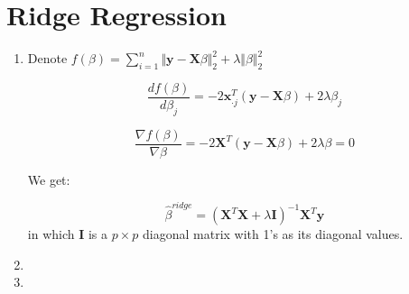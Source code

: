 \documentclass[paper=letter, fontsize=12pt]{article}
\begin{document}
\section{Ridge Regression}

\begin{enumerate}[label=(\alph*)]
	\item Denote $f(\beta) = \sum_{i = 1}^{n} \Vert \boldsymbol{y} - \boldsymbol{X} \beta \Vert_2^2 + \lambda \Vert \beta \Vert_2^2$
	
	$$\frac{d f(\beta)}{d \beta_j} = -2 \boldsymbol{x}_{\cdot j}^T (\boldsymbol{y} - \boldsymbol{X} \beta ) + 2 \lambda \beta_j$$
	
	$$\frac{\nabla f(\beta)}{\nabla \beta} = -2 \boldsymbol{X}^T (\boldsymbol{y} - \boldsymbol{X} \beta) + 2 \lambda \beta = 0$$
	
	We get:
	
	$$\hat{\beta}^{ridge} = (\boldsymbol{X}^T \boldsymbol{X} + \lambda \boldsymbol{I})^{-1} \boldsymbol{X}^T \boldsymbol{y}$$ in which $\boldsymbol{I}$ is a $p \times p$ diagonal matrix with 1's as its diagonal values.
	
	\item
	
	\item   
\end{enumerate}
\end{document}
